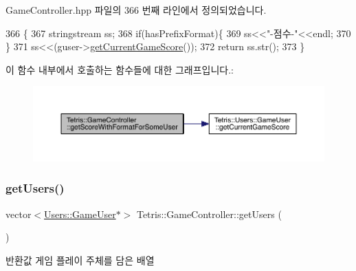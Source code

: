 Game\+Controller.\+hpp 파일의 366 번째 라인에서 정의되었습니다.


\begin{DoxyCode}
366                                                                                   \{
367             stringstream ss;
368             \textcolor{keywordflow}{if}(hasPrefixFormat)\{
369                 ss<<\textcolor{stringliteral}{"-점수-"}<<endl;
370             \}
371             ss<<(guser->\hyperlink{class_tetris_1_1_users_1_1_game_user_a93bde8123ee0dc9333d62a44b904023c}{getCurrentGameScore}());
372             \textcolor{keywordflow}{return} ss.str();
373         \}
\end{DoxyCode}
이 함수 내부에서 호출하는 함수들에 대한 그래프입니다.\+:
\nopagebreak
\begin{figure}[H]
\begin{center}
\leavevmode
\includegraphics[width=350pt]{db/dd2/class_tetris_1_1_game_controller_ab9ee25a033698516dd98c254ab8f8f1b_cgraph}
\end{center}
\end{figure}
\mbox{\label{class_tetris_1_1_game_controller_aa3c2d1f1b5539576116833526478355a}} 
\subsubsection{\texorpdfstring{get\+Users()}{getUsers()}}
{\footnotesize\ttfamily vector$<$\hyperlink{class_tetris_1_1_users_1_1_game_user}{Users\+::\+Game\+User}$\ast$$>$ Tetris\+::\+Game\+Controller\+::get\+Users (\begin{DoxyParamCaption}{ }\end{DoxyParamCaption})\hspace{0.3cm}{\ttfamily [inline]}}

\begin{DoxyReturn}{반환값}
게임 플레이 주체를 담은 배열 
\end{DoxyReturn}


